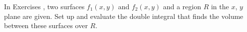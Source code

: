 {\noindent In Exercises} 
{,  two surfaces $f_1(x,y)$ and $f_2(x,y)$ and a region $R$ in the $x$, $y$ plane are given. Set up and evaluate the double integral that finds the volume between these surfaces over $R$.
}
